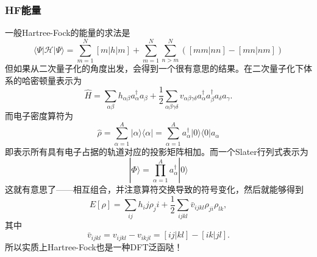\documentclass[12pt,a4paper,openany,twoside]{article}
\numberwithin{equation}{section}
\begin{document}
                \subsubsection{HF能量}
                一般Hartree-Fock的能量的求法是
                \begin{equation}
                    \langle \Psi|\mathscr{H}|\Psi\rangle =\sum_{m=1}^N [m|h|m] + \sum_{m=1}^N\sum_{n>m}^N \left([mm|nn] - [mn|nm]\right)
                \end{equation}
                但如果从二次量子化的角度出发，会得到一个很有意思的结果\cite{helgaker2014molecular}。在二次量子化下体系的哈密顿量表示为
                \begin{equation}
                    \hat{H} = \sum_{\alpha \beta} h_{\alpha \beta} a_\alpha^\dagger a_\beta + \frac{1}{2} \sum_{\alpha \beta \gamma \delta} v_{\alpha \beta \gamma \delta} a_\alpha ^\dagger a_\beta ^\dagger a_\delta a_\gamma.
                \end{equation}
                而电子密度算符为
                \begin{equation}
                    \hat{\rho} = \sum_{\alpha = 1} ^{A} |\alpha \rangle \langle \alpha | = \sum_{\alpha = 1} ^{A} a_\alpha^\dagger |0\rangle\langle 0| a_\alpha
                \end{equation}
                即表示所有具有电子占据的轨道对应的投影矩阵相加。而一个Slater行列式表示为
                \begin{equation}
                    |\Phi\rangle = \prod_{\alpha = 1}^A a_\alpha^\dagger |0\rangle
                \end{equation}
                这就有意思了——相互组合，并注意算符交换导致的符号变化，然后就能够得到
                \begin{equation}
                    E[\rho] = \sum_{ij} h_ij \rho_ji + \frac{1}{2} \sum_{ijkl} \bar{v}_{ijkl} \rho_{ji} \rho_{lk},
                \end{equation}
                其中
                \begin{equation}
                    \bar{v}_{ijkl} = v_{ijkl} - v_{ikjl} = [ij|kl] - [ik|jl].
                \end{equation}
                所以实质上Hartree-Fock也是一种DFT泛函哒！
\end{document}
